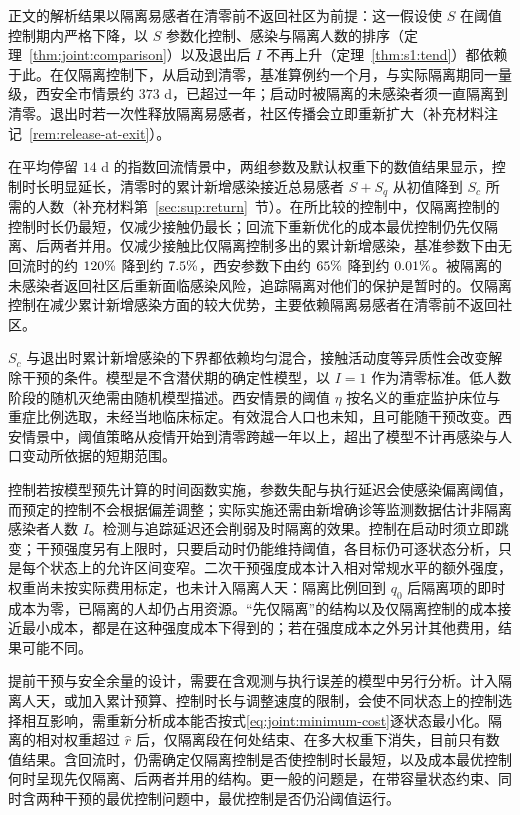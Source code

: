 \label{sec:discussion:return}
正文的解析结果以隔离易感者在清零前不返回社区为前提：这一假设使 $S$ 在阈值控制期内严格下降，以 $S$ 参数化控制、感染与隔离人数的排序（定理~\ref{thm:joint:comparison}）以及退出后 $I$ 不再上升（定理~\ref{thm:s1:tend}）都依赖于此。在仅隔离控制下，从启动到清零，基准算例约一个月，与实际隔离期同一量级，西安全市情景约 $373$ d，已超过一年；启动时被隔离的未感染者须一直隔离到清零。退出时若一次性释放隔离易感者，社区传播会立即重新扩大（补充材料注记~\ref{rem:release-at-exit}）。

在平均停留 $14$ d 的指数回流情景中，两组参数及默认权重下的数值结果显示，控制时长明显延长，清零时的累计新增感染接近总易感者 $S+S_q$ 从初值降到 $S_c$ 所需的人数（补充材料第~\ref{sec:sup:return}~节）。在所比较的控制中，仅隔离控制的控制时长仍最短，仅减少接触仍最长；回流下重新优化的成本最优控制仍先仅隔离、后两者并用。仅减少接触比仅隔离控制多出的累计新增感染，基准参数下由无回流时的约 $120\%$ 降到约 $7.5\%$，西安参数下由约 $65\%$ 降到约 $0.01\%$。被隔离的未感染者返回社区后重新面临感染风险，追踪隔离对他们的保护是暂时的。仅隔离控制在减少累计新增感染方面的较大优势，主要依赖隔离易感者在清零前不返回社区。

\label{sec:dom:limits}
$S_c$ 与退出时累计新增感染的下界都依赖均匀混合，接触活动度等异质性会改变解除干预的条件\cite{Britton2020}。模型是不含潜伏期的确定性模型，以 $I=1$ 作为清零标准。低人数阶段的随机灭绝需由随机模型描述\cite{Allen2017}。西安情景的阈值 $\eta$ 按名义的重症监护床位与重症比例选取，未经当地临床标定。有效混合人口也未知，且可能随干预改变。西安情景中，阈值策略从疫情开始到清零跨越一年以上，超出了模型不计再感染与人口变动所依据的短期范围。

控制若按模型预先计算的时间函数实施，参数失配与执行延迟会使感染偏离阈值，而预定的控制不会根据偏差调整；实际实施还需由新增确诊等监测数据估计非隔离感染者人数 $I$。检测与追踪延迟还会削弱及时隔离的效果\cite{Hellewell2020,Ferretti2020}。控制在启动时须立即跳变；干预强度另有上限时，只要启动时仍能维持阈值，各目标仍可逐状态分析，只是每个状态上的允许区间变窄。二次干预强度成本计入相对常规水平的额外强度，权重尚未按实际费用标定，也未计入隔离人天：隔离比例回到 $q_0$ 后隔离项的即时成本为零，已隔离的人却仍占用资源。“先仅隔离”的结构以及仅隔离控制的成本接近最小成本，都是在这种强度成本下得到的；若在强度成本之外另计其他费用，结果可能不同。

提前干预与安全余量的设计，需要在含观测与执行误差的模型中另行分析。计入隔离人天，或加入累计预算、控制时长与调整速度的限制，会使不同状态上的控制选择相互影响，需重新分析成本能否按式\eqref{eq:joint:minimum-cost}逐状态最小化。隔离的相对权重超过 $\hat r$ 后，仅隔离段在何处结束、在多大权重下消失，目前只有数值结果。含回流时，仍需确定仅隔离控制是否使控制时长最短，以及成本最优控制何时呈现先仅隔离、后两者并用的结构。更一般的问题是，在带容量状态约束、同时含两种干预的最优控制问题中，最优控制是否仍沿阈值运行。

\FloatBarrier
